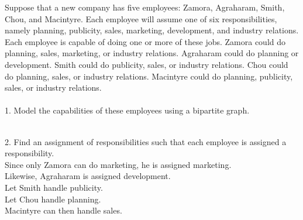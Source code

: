 \documentclass[12pt]{article}
\newenvironment{problem}[2][Problem]{\begin{trivlist}
\item[\hskip \labelsep {\bfseries #1}\hskip \labelsep {\bfseries #2.}]}{\end{trivlist}}
\begin{document}
\begin{problem}{3}
    Suppose that a new company has five employees: Zamora, Agraharam, Smith, Chou,
    and Macintyre. Each employee will assume one of six responsibilities, namely planning, publicity,
    sales, marketing, development, and industry relations. Each employee is capable of doing one or
    more of these jobs. Zamora could do planning, sales, marketing, or industry relations. Agraharam
    could do planning or development. Smith could do publicity, sales, or industry relations. Chou
    could do planning, sales, or industry relations. Macintyre could do planning, publicity, sales, or
    industry relations.\\\\
    1. Model the capabilities of these employees using a bipartite graph.\\\\
    2. Find an assignment of responsibilities such that each employee is assigned a responsibility.\\
    Since only Zamora can do marketing, he is assigned marketing.\\
    Likewise, Agraharam is assigned development.\\
    Let Smith handle publicity.\\
    Let Chou handle planning.\\
    Macintyre can then handle sales.\\

\end{problem}
 
\end{document}
